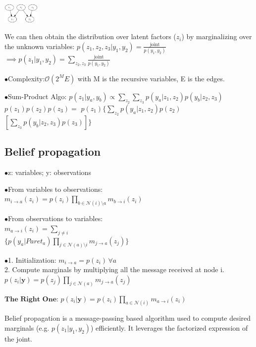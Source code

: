 \documentclass[10pt,a4paper,landscape]{article}
\renewcommand{\bf}[1]{\ensuremath{\mathbf{#1}}}
\begin{document}
\begin{multicols*}{6}
\begin{colfig}
  \centering
  \includegraphics[height=1cm]{images/bayesian-network.png}
\end{colfig}

We can then obtain the distribution over latent factors ($z_i$) by marginalizing over the unknown variables:
$p(z_1, z_2, z_3 | y_1, y_2) = \frac{\text{joint}}{p(y_1, y_2)}$
$\implies p(z_1 | y_1, y_2) = \sum_{z_2, z_3} \frac{\text{joint}}{p(y_1, y_2)}$

$\bullet$Complexity:$\mathcal{O}(2^ME)$ with M is the recursive variables, E is the edges.

$\bullet$Sum-Product Algo: $p(z_1 | y_a, y_b) \propto \sum_{z_2} \sum_{z_3} p(y_a | z_1, z_2) p(y_b | z_2, z_3)$ \\
$p(z_1) p(z_2) p(z_3) =$
$p(z_1)\lbrace\sum_{z_2}p(y_a|z_1, z_2)p(z_2)$\\
$ [\sum_{z_3}p(y_b|z_2, z_3)p(z_3)]   \rbrace$

\subsection{Belief propagation}
$\bullet$z: variables; y: observations

$\bullet$From variables to observations:\\
$m_{i\rightarrow a}(z_i)=p(z_i)\prod_{b\in \mathcal{N}(i)\setminus a}m_{b\rightarrow i}(z_i)$

$\bullet$From observations to variables:\\
$m_{a\rightarrow i}(z_i)=\sum_{j\neq i}$\\
$\lbrace p(y_a|Paret_a) \prod_{j\in \mathcal{N}(a) \setminus i} m_{j\rightarrow a}(z_j)  \rbrace$

$\bullet$1. Initialization: $m_{i\rightarrow a}=p(z_i) \, \forall a$\\
2. Compute marginals by multiplying all the message received at node i.\\
$p(z_i|\bf{y})=p(z_j)\prod_{j\in \mathcal{N}(a)}m_{j\rightarrow a}(z_j)$

$\textbf{The Right One:}$ $p(z_i|\bf{y})=p(z_i)\prod_{a\in \mathcal{N}(i)}m_{a\rightarrow i}(z_i)$


Belief propagation is a message-passing based algorithm used to compute desired marginals (e.g. $p(z_1 | y_1, y_2)$) efficiently. It leverages the factorized expression of the joint. 


\end{multicols*}
\end{document}
